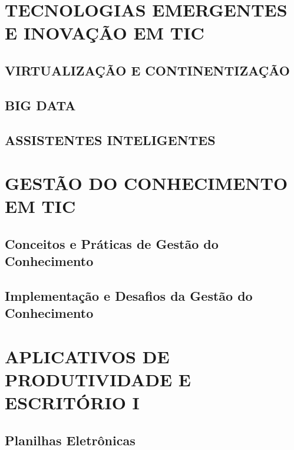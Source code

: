 \documentclass[
]{book}
\begin{document}
\chapter{TECNOLOGIAS EMERGENTES E INOVAÇÃO EM TIC}\label{tecnologias-emergentes-e-inovauxe7uxe3o-em-tic}

\section{VIRTUALIZAÇÃO E CONTINENTIZAÇÃO}\label{virtualizauxe7uxe3o-e-continentizauxe7uxe3o}

\section{BIG DATA}\label{big-data}

\section{ASSISTENTES INTELIGENTES}\label{assistentes-inteligentes}

\chapter{GESTÃO DO CONHECIMENTO EM TIC}\label{gestuxe3o-do-conhecimento-em-tic}

\section{Conceitos e Práticas de Gestão do Conhecimento}\label{conceitos-e-pruxe1ticas-de-gestuxe3o-do-conhecimento}

\section{Implementação e Desafios da Gestão do Conhecimento}\label{implementauxe7uxe3o-e-desafios-da-gestuxe3o-do-conhecimento}

\chapter{APLICATIVOS DE PRODUTIVIDADE E ESCRITÓRIO I}\label{aplicativos-de-produtividade-e-escrituxf3rio-i}

\section{Planilhas Eletrônicas}\label{planilhas-eletruxf4nicas}
\end{document}
